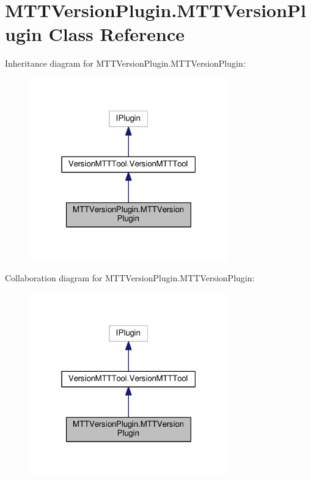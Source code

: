 \hypertarget{classMTTVersionPlugin_1_1MTTVersionPlugin}{\section{M\-T\-T\-Version\-Plugin.\-M\-T\-T\-Version\-Plugin Class Reference}
\label{classMTTVersionPlugin_1_1MTTVersionPlugin}
}


Inheritance diagram for M\-T\-T\-Version\-Plugin.\-M\-T\-T\-Version\-Plugin\-:
\nopagebreak
\begin{figure}[H]
\begin{center}
\leavevmode
\includegraphics[width=244pt]{classMTTVersionPlugin_1_1MTTVersionPlugin__inherit__graph}
\end{center}
\end{figure}


Collaboration diagram for M\-T\-T\-Version\-Plugin.\-M\-T\-T\-Version\-Plugin\-:
\nopagebreak
\begin{figure}[H]
\begin{center}
\leavevmode
\includegraphics[width=244pt]{classMTTVersionPlugin_1_1MTTVersionPlugin__coll__graph}
\end{center}
\end{figure}
